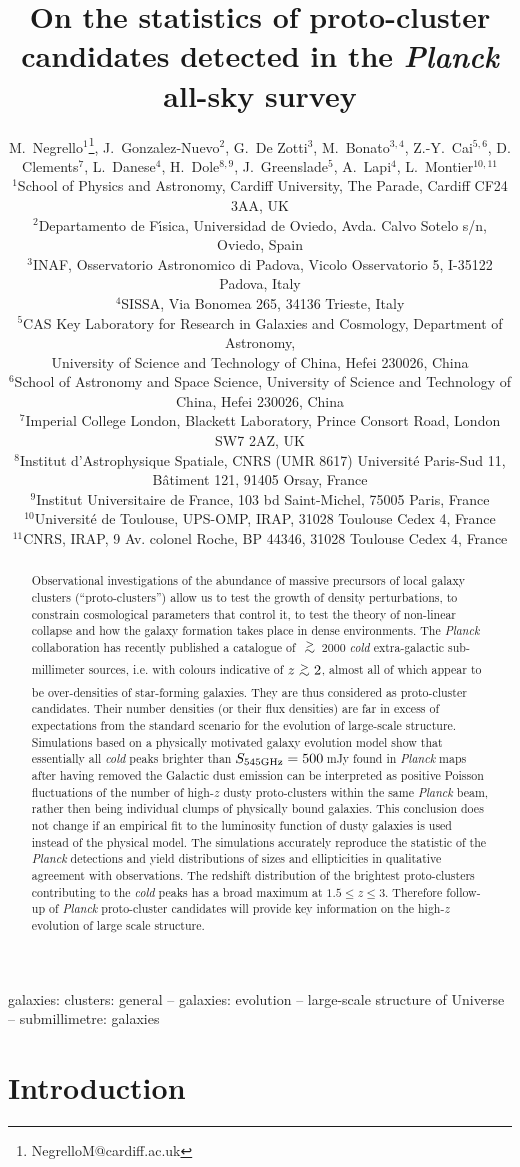 \documentclass[useAMS,usenatbib]{mn2e}
\title[Statistics of proto-clusters]
  {On the statistics of proto-cluster candidates detected in the {\it Planck} all-sky survey}
\author[M. Negrello et al.]
{M.~Negrello$^{1}$\thanks{NegrelloM@cardiff.ac.uk},
J.~Gonzalez-Nuevo$^{2}$,
G.~De Zotti$^{3}$,
M.~Bonato$^{3,4}$,
Z.-Y.~Cai$^{5, 6}$,
\newauthor
D. Clements$^{7}$,
L.~Danese$^{4}$,
H.~Dole$^{8,9}$,
J.~Greenslade$^{5}$,
A.~Lapi$^{4}$,
L.~Montier$^{10,11}$
\\
%
$^{1}$School of Physics and Astronomy, Cardiff University, The Parade,
Cardiff CF24 3AA, UK \\
$^{2}$Departamento de F\'{\i}sica, Universidad de Oviedo, Avda. Calvo Sotelo s/n, Oviedo, Spain \\
$^{3}$INAF, Osservatorio Astronomico di Padova, Vicolo Osservatorio 5, I-35122 Padova, Italy \\
$^{4}$SISSA, Via Bonomea 265, 34136 Trieste, Italy \\
$^{5}$CAS Key Laboratory for Research in Galaxies and Cosmology,
Department of Astronomy, \\ University of Science and Technology of
China, Hefei 230026, China \\
$^{6}$School of Astronomy and Space Science, University of Science and
Technology of China, Hefei 230026, China \\
$^{7}$Imperial College London, Blackett Laboratory, Prince Consort Road, London SW7 2AZ, UK \\
$^{8}$Institut d'Astrophysique Spatiale, CNRS (UMR 8617) Universit\'e Paris-Sud 11, B\^atiment 121, 91405 Orsay, France \\
$^{9}$Institut Universitaire de France, 103 bd Saint-Michel, 75005 Paris, France \\
$^{10}$Universit\'e de Toulouse, UPS-OMP, IRAP, 31028 Toulouse Cedex 4, France \\
$^{11}$CNRS, IRAP, 9 Av. colonel Roche, BP 44346, 31028 Toulouse Cedex 4, France
}
\def\gsim{\,\lower2truept\hbox{${> \atop\hbox{\raise4truept\hbox{$\sim$}}}$}\,}
\begin{document}
\label{firstpage}

\maketitle

\begin{abstract}
Observational investigations of the abundance of massive precursors of
local galaxy clusters (``proto-clusters'') allow us
to test the growth of density perturbations, to constrain cosmological
parameters that control it, to test the theory of non-linear collapse
and how the galaxy formation takes place in dense environments.
The \textit{Planck} collaboration has recently published a catalogue
of $\gsim$\,2000
{\it cold} extra-galactic sub-millimeter sources, i.e. with colours
indicative of $z\gsim2$, almost all of which
appear to be over-densities of star-forming galaxies.
They are thus considered as proto-cluster candidates. Their number densities (or their flux densities) are far in
excess of expectations
from the standard scenario for the evolution of large-scale
structure.
Simulations based on a physically motivated galaxy evolution model
show that essentially all {\it cold}  peaks brighter than
$S_{545\rm GHz}=500\, $mJy  found in {\it Planck} maps after having
removed the Galactic dust emission can be interpreted as positive Poisson fluctuations of the number of high-$z$ dusty proto-clusters
within the same \textit{Planck} beam, rather then being individual clumps of physically bound galaxies.
This conclusion does not change if an empirical fit to the luminosity
  function of dusty galaxies is used instead of the physical model.
The simulations accurately reproduce
the statistic of the {\it Planck} detections and yield distributions
of sizes and ellipticities in qualitative agreement with observations.
The redshift distribution of the brightest proto-clusters contributing
to the {\it cold} peaks has a broad maximum at $1.5 \le z  \le 3$.
Therefore follow-up of \textit{Planck} proto-cluster candidates will  provide key information on the high-$z$ evolution of large scale structure.
\end{abstract}

\begin{keywords}
galaxies: clusters: general -- galaxies: evolution -- large-scale structure of Universe -- submillimetre: galaxies
\end{keywords}

\section{Introduction}\label{sec:intro}
\end{document}

